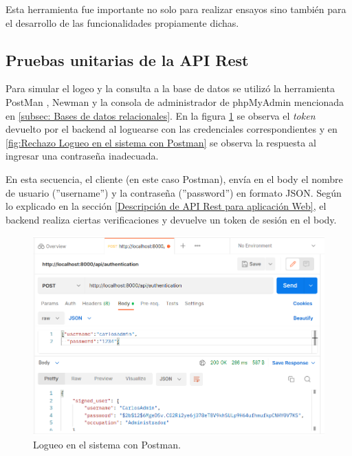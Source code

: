 Esta herramienta fue importante no solo para realizar ensayos sino también para el desarrollo de las funcionalidades propiamente dichas.


\subsection{Pruebas unitarias de la API Rest}

Para simular el logeo y la consulta a la base de datos se utilizó la herramienta PostMan \citep{WEBSITE:30}, Newman \citep{WEBSITE:35} y la consola de administrador de phpMyAdmin mencionada en \ref{subsec: Bases de datos relacionales}. En la figura \ref{fig:Logueo en el sistema con Postman} se observa el \textit{token} devuelto por el backend al loguearse con las credenciales correspondientes y en \ref{fig:Rechazo Logueo en el sistema con Postman} se observa la respuesta al ingresar una contraseña inadecuada.


En esta secuencia, el cliente (en este caso Postman), envía en el body el nombre de usuario (''username'') y la contraseña (''password'') en formato JSON. Según lo explicado en la sección  \ref{Descripción de API Rest para aplicación Web}, el backend realiza ciertas verificaciones y devuelve un token de sesión en el body.

\begin{figure}[ht]
	\centering
	\includegraphics[scale=.35]{./Figures/auth.png}
	\caption{Logueo en el sistema con Postman.}
	\label{fig:Logueo en el sistema con Postman}
\end{figure}

